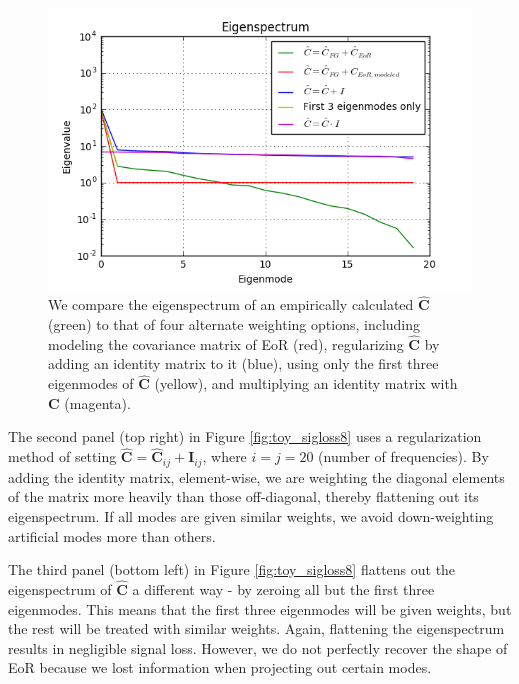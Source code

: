 \documentclass[preprint2,numberedappendix,tighten]{aastex6}  %
\begin{document}
\begin{figure}
	\centering
	\includegraphics[trim={0.3cm 0.3cm 0.3cm 0.3cm},clip,width=\columnwidth]{plots/toy_sigloss14.png}
	\caption{We compare the eigenspectrum of an empirically calculated $\hat{\textbf{C}}$ (green) to that of four alternate weighting options, including modeling the covariance matrix of EoR (red), regularizing $\hat{\textbf{C}}$ by adding an identity matrix to it (blue), using only the first three eigenmodes of $\hat{\textbf{C}}$ (yellow), and multiplying an identity matrix with $\textbf{C}$ (magenta). }
	\label{fig:toy_sigloss14}
\end{figure}

The second panel (top right) in Figure \ref{fig:toy_sigloss8} uses a regularization method of setting $\hat{\textbf{C}} = \hat{\textbf{C}}_{ij} + \textbf{I}_{ij}$, where $i$$=$$j$$=$$20$ (number of frequencies). By adding the identity matrix, element-wise, we are weighting the diagonal elements of the matrix more heavily than those off-diagonal, thereby flattening out its eigenspectrum. If all modes are given similar weights, we avoid down-weighting artificial modes more than others.  

The third panel (bottom left) in Figure \ref{fig:toy_sigloss8} flattens out the eigenspectrum of $\hat{\textbf{C}}$ a different way - by zeroing all but the first three eigenmodes. This means that the first three eigenmodes will be given weights, but the rest will be treated with similar weights. Again, flattening the eigenspectrum results in negligible signal loss. However, we do not perfectly recover the shape of EoR because we lost information when projecting out certain modes. 
\end{document}
